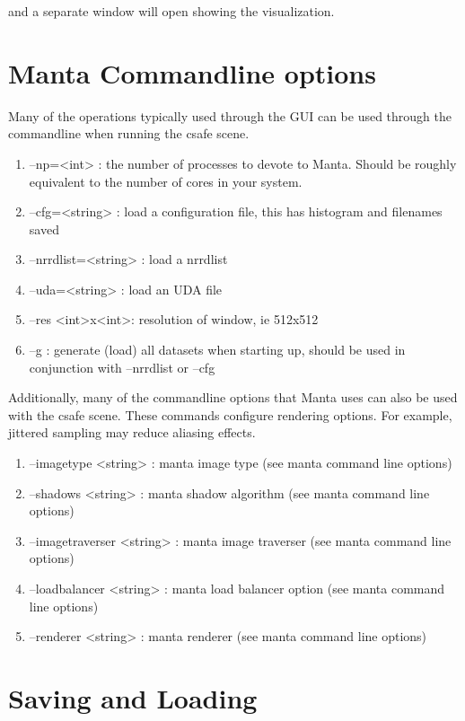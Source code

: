 and a separate window will open showing the visualization. 

\section{Manta Commandline options} 
Many of the operations typically used through the GUI can be used through the commandline when running the csafe scene.

\begin{enumerate}

\item
--np=<int>  : the number of processes to devote to Manta. Should be roughly equivalent to the number of cores in your system.
\item
--cfg=<string>  : load a configuration file, this has histogram and filenames saved
\item
--nrrdlist=<string>  : load a nrrdlist
\item
--uda=<string>  : load an UDA file
\item
--res <int>x<int>: resolution of window, ie 512x512
\item
--g  : generate (load) all datasets when starting up, should be used in conjunction with --nrrdlist or --cfg

\end{enumerate}

Additionally, many of the commandline options that Manta uses can also be used with the csafe scene.  These commands configure rendering options.  For example, jittered sampling may reduce aliasing effects.

\begin{enumerate}

\item
--imagetype <string> : manta image type (see manta command line options)
\item
--shadows <string> : manta shadow algorithm (see manta command line options)
\item
--imagetraverser <string> : manta image traverser (see manta command line options)
\item
--loadbalancer <string> : manta load balancer option (see manta command line options)
\item
--renderer <string> : manta renderer (see manta command line options)


\end{enumerate}

\section{Saving and Loading}

